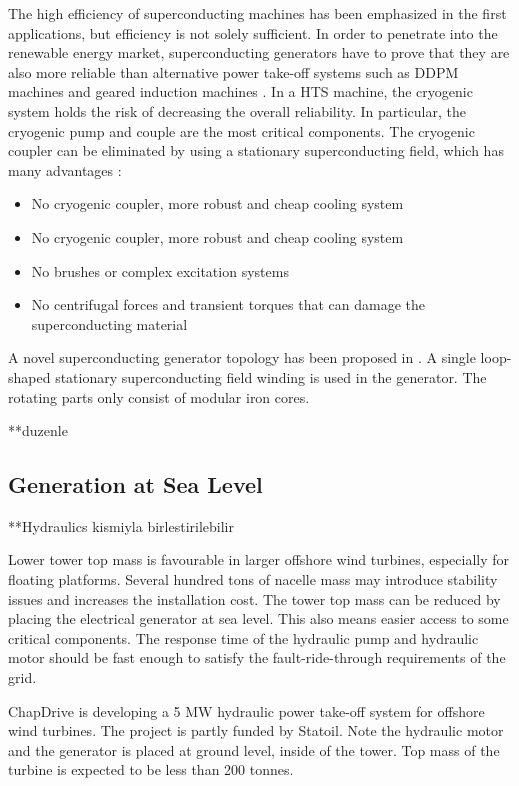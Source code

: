 \documentclass[a4paper, 11pt]{article} %
\begin{document}
The high efficiency of superconducting machines has been emphasized in the first applications, but efficiency is not solely sufficient. In order to penetrate into the renewable energy market,  superconducting generators have to prove that they are also more reliable than alternative power take-off systems such as DDPM machines and geared induction machines \cite{Abrahamsen2010}. In a HTS machine, the cryogenic system holds the risk of decreasing the overall reliability. In particular, the cryogenic pump and couple are the most critical components. The cryogenic coupler can be eliminated by using a stationary superconducting field, which has many advantages \cite{Gieras2008a}:
\begin{itemize}
	\item No cryogenic coupler, more robust and cheap cooling system
	\item No cryogenic coupler, more robust and cheap cooling system
	\item No brushes or complex excitation systems
	\item No centrifugal forces and transient torques that can damage the superconducting material
\end{itemize}


A novel superconducting generator topology has been proposed in \cite{Keysan2011e}. A single loop-shaped stationary superconducting field winding is used in the generator. The rotating parts only consist of modular iron cores. 

**duzenle

\subsection{Generation at Sea Level}

**Hydraulics kismiyla birlestirilebilir

Lower tower top mass is favourable in larger offshore wind turbines, especially for floating platforms. Several hundred tons of nacelle mass may introduce stability issues and increases the installation cost. The tower top mass can be reduced by placing the electrical generator at sea level. This also means easier access to some critical components. The response time of the hydraulic pump and hydraulic motor should be fast enough to satisfy the fault-ride-through requirements of the grid.

ChapDrive is developing a 5 MW hydraulic power take-off system for offshore wind turbines. The project is partly funded by Statoil. Note the hydraulic motor and the generator is placed at ground level, inside of the tower. Top mass of the turbine is expected to be less than 200 tonnes.
\end{document}
